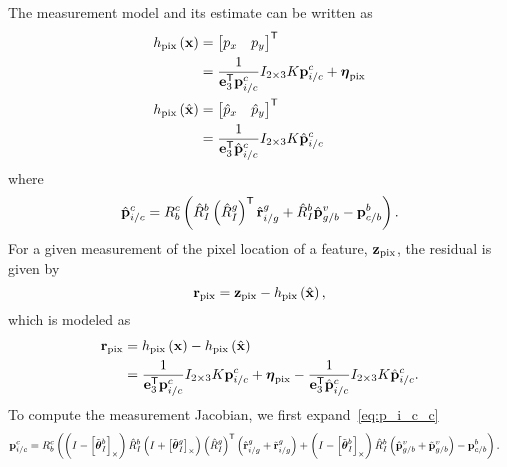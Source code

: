 The measurement model and its estimate can be written as
\begin{align}
  h_{\text{pix}} \left( \boldsymbol{\mathrm{x}} \right)
  &= \begin{bmatrix} p_x & p_y \end{bmatrix}^{\mathsf{T}} \\
  &= \frac{1}{\boldsymbol{\mathrm{e}}_3^{\mathsf{T}} \boldsymbol{\mathrm{p}}_{i/c}^c} I_{2 \times 3} K
  \boldsymbol{\mathrm{p}}_{i/c}^c + \boldsymbol{\mathrm{\eta}}_{\text{pix}} \\
  h_{\text{pix}} \left( \hat{\boldsymbol{\mathrm{x}}} \right)
  &= \begin{bmatrix} \hat{p}_x & \hat{p}_y \end{bmatrix}^{\mathsf{T}} \\
  &= \frac{1}{\boldsymbol{\mathrm{e}}_3^{\mathsf{T}} \hat{\boldsymbol{\mathrm{p}}}_{i/c}^c} I_{2 \times 3} K
  \hat{\boldsymbol{\mathrm{p}}}_{i/c}^c
\end{align}
where
\begin{align}
  \hat{\boldsymbol{\mathrm{p}}}_{i/c}^c = R_b^c \left( \hat{R}_I^b \left( \hat{R}_I^g \right)^{\mathsf{T}}
  \hat{\boldsymbol{\mathrm{r}}}_{i/g}^g + \hat{R}_I^b \hat{\boldsymbol{\mathrm{p}}}_{g/b}^v - \boldsymbol{\mathrm{p}}_{c/b}^b
\right).
\end{align}
For a given measurement of the pixel location of a feature,
$\boldsymbol{\mathrm{z}}_{\text{pix}}$, the residual is given by
\begin{equation}
  \boldsymbol{\mathrm{r}}_{\text{pix}} = \boldsymbol{\mathrm{z}}_{\text{pix}} - h_{\text{pix}} \left( \hat{\boldsymbol{\mathrm{x}}}
    \right),
\end{equation}
which is modeled as
\begin{align}
  \boldsymbol{\mathrm{r}}_{\text{pix}} &= h_{\text{pix}} \left( \boldsymbol{\mathrm{x}} \right) - h_{\text{pix}} \left( \hat{\boldsymbol{\mathrm{x}}}
    \right) \\
  &= \frac{1}{\boldsymbol{\mathrm{e}}_3^{\mathsf{T}} \boldsymbol{\mathrm{p}}_{i/c}^c} I_{2 \times 3} K
  \boldsymbol{\mathrm{p}}_{i/c}^c + \boldsymbol{\mathrm{\eta}}_{\text{pix}} - \frac{1}{\boldsymbol{\mathrm{e}}_3^{\mathsf{T}} \hat{\boldsymbol{\mathrm{p}}}_{i/c}^c} I_{2 \times 3} K
  \hat{\boldsymbol{\mathrm{p}}}_{i/c}^c.
\end{align}
To compute the measurement Jacobian, we first expand~\eqref{eq:p_i_c_c}
\begin{align}
  \boldsymbol{\mathrm{p}}_{i/c}^c &= R_b^c \left( \left( I - \left[ \tilde{\boldsymbol{\mathrm{\theta}}}_I^b
     \right]_{\times} \right) \hat{R}_I^b \left( I + \left[ \tilde{\boldsymbol{\mathrm{\theta}}}_I^g  \right]_{\times}
  \right) \left( \hat{R}_I^g \right)^{\mathsf{T}}
\left( \hat{\boldsymbol{\mathrm{r}}}_{i/g}^g  + \tilde{\boldsymbol{\mathrm{r}}}_{i/g}^g \right) + \left( I - \left[ \tilde{\boldsymbol{\mathrm{\theta}}}_I^b
 \right]_{\times} \right) \hat{R}_I^b \left( \hat{\boldsymbol{\mathrm{p}}}_{g/b}^v + \tilde{\boldsymbol{\mathrm{p}}}_{g/b}^v \right) - \boldsymbol{\mathrm{p}}_{c/b}^b \right).
\end{align}

